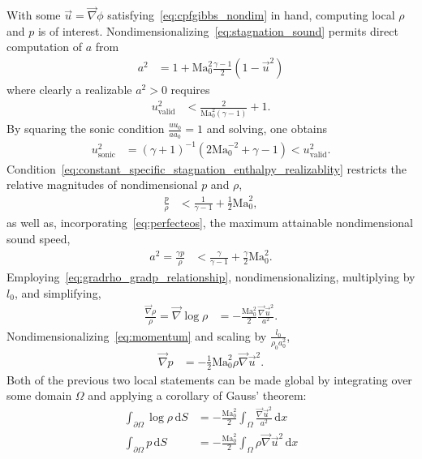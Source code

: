 \documentclass[letterpaper,11pt,nointlimits,reqno]{amsart}
\newcommand{\Mach}[1][]{\mbox{Ma}_{#1}}
\begin{document}
With some $\vec{u}=\vec{\nabla}\phi$ satisfying~\eqref{eq:cpfgibbs_nondim} in
hand, computing local $\rho$ and $p$ is of interest.
Nondimensionalizing~\eqref{eq:stagnation_sound} permits direct computation of
$a$ from
\begin{align}
  a^2 &= 1 + \Mach[0]^2\frac{\gamma-1}{2}\left(1-\vec{u}^2\right)
\label{eq:stagnation_sound_nondim}
\end{align}
where clearly a realizable $a^2>0$ requires
\begin{align}
  u^2_\text{valid} &< \frac{2}{\Mach[0]^2\left(\gamma-1\right)} + 1
.
\label{eq:stagnation_sound_realizability_nondim}
\end{align}
By squaring the sonic condition $\frac{u u_0}{a a_0}=1$ and solving, one
obtains
\begin{align}
    u^2_\text{sonic}
    &=
    \left(\gamma+1\right)^{-1}
    \left(2\Mach[0]^{-2} + \gamma - 1\right)
    <
    u^2_\text{valid}
\label{eq:u_sonic}
.
\end{align}
Condition~\eqref{eq:constant_specific_stagnation_enthalpy_realizablity}
restricts the relative magnitudes of nondimensional $p$ and $\rho$,
\begin{align}
    \frac{p}{\rho} &< \frac{1}{\gamma-1} + \frac{1}{2}\Mach[0]^2
\label{eq:constant_specific_stagnation_enthalpy_realizablity_nondim}
,
\end{align}
as well as, incorporating~\eqref{eq:perfecteos}, the maximum attainable
nondimensional sound speed,
\begin{align}
    a^2 = \frac{\gamma p}{\rho}
    &< \frac{\gamma}{\gamma-1} + \frac{\gamma}{2}\Mach[0]^2
    \label{eq:nondima2}
.
\end{align}
Employing~\eqref{eq:gradrho_gradp_relationship},
nondimensionalizing, multiplying by $l_0$, and simplifying,
\begin{align}
  \frac{\vec{\nabla}\rho}{\rho}
  =
  \vec{\nabla}\log\rho
  &=
  -\frac{\Mach[0]^2}{2}\frac{\vec{\nabla}\vec{u}^2}{a^2}
.
\end{align}
Nondimensionalizing~\eqref{eq:momentum} and scaling by $\frac{l_0}{\rho_0
a_0^2}$,
\begin{align}
  \vec{\nabla} p &= - \frac{1}{2}\Mach[0]^2 \rho \vec{\nabla}\vec{u}^2
.
\end{align}
Both of the previous two local statements can be made global by integrating
over some domain $\Omega$ and applying a corollary of Gauss' theorem:
\begin{align}
  \int_{\partial\Omega} \log\rho \, \mathrm{d}S
  &=
  - \frac{\Mach[0]^2}{2}\int_{\Omega}
    \frac{\vec{\nabla}\vec{u}^2}{a^2} \, \mathrm{d}x
\label{eq:logrho_nondim}
\\
  \int_{\partial\Omega} p \, \mathrm{d}S
  &=
  - \frac{\Mach[0]^2}{2}\int_{\Omega} \rho \vec{\nabla}\vec{u}^2 \, \mathrm{d}x
\label{eq:p_nondim}
\end{align}
\end{document}
